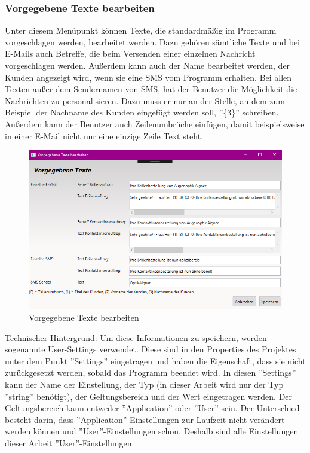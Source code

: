 \subsubsection{Vorgegebene Texte bearbeiten}
Unter diesem Menüpunkt können Texte, die standardmäßig im Programm vorgeschlagen werden, bearbeitet werden. Dazu gehören sämtliche Texte und bei E-Mails auch Betreffe, die beim Versenden einer einzelnen Nachricht vorgeschlagen werden. Außerdem kann auch der Name bearbeitet werden, der Kunden angezeigt wird, wenn sie eine SMS vom Programm erhalten. \newline Bei allen Texten außer dem Sendernamen von SMS, hat der Benutzer die Möglichkeit die Nachrichten zu personalisieren. Dazu muss er nur an der Stelle, an dem zum Beispiel der Nachname des Kunden eingefügt werden soll, ''\{3\}'' schreiben. Außerdem kann der Benutzer auch Zeilenumbrüche einfügen, damit beispielsweise in einer E-Mail nicht nur eine einzige Zeile Text steht.
\begin{figure}[H]
\begin{center}
	\includegraphics[scale=0.7]{images/VorgegebeneTexteBearbeiten.png}
\end{center}
	\caption{Vorgegebene Texte bearbeiten}
	\label{fig:sample}
\end{figure} 
\noindent \underline{Technischer Hintergrund}: \linebreak Um diese Informationen zu speichern, werden sogenannte User-Settings verwendet. Diese sind in den Properties des Projektes unter dem Punkt ''Settings'' eingetragen und haben die Eigenschaft, dass sie nicht zurückgesetzt werden, sobald das Programm beendet wird. In diesen ''Settings'' kann der Name der Einstellung, der Typ (in dieser Arbeit wird nur der Typ ''string'' benötigt), der Geltungsbereich und der Wert  eingetragen werden. Der Geltungsbereich kann entweder ''Application'' oder ''User'' sein. Der Unterschied besteht darin, dass ''Application''-Einstellungen zur Laufzeit nicht verändert werden können und ''User''-Einstellungen schon. Deshalb sind alle Einstellungen dieser Arbeit ''User''-Einstellungen.

